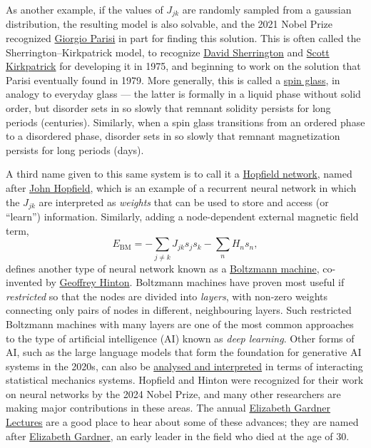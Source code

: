 As another example, if the values of $J_{jk}$ are randomly sampled from a gaussian distribution, the resulting model is also solvable, and the 2021 Nobel Prize recognized \href{https://en.wikipedia.org/wiki/Giorgio_Parisi}{Giorgio Parisi} in part for finding this solution.
This is often called the Sherrington--Kirkpatrick model, to recognize \href{https://en.wikipedia.org/wiki/David_Sherrington_(physicist)}{David Sherrington} and \href{https://en.wikipedia.org/wiki/Scott_Kirkpatrick}{Scott Kirkpatrick} for developing it in 1975, and beginning to work on the solution that Parisi eventually found in 1979.
More generally, this is called a \href{https://en.wikipedia.org/wiki/Spin_glass}{spin glass}, in analogy to everyday glass --- the latter is formally in a liquid phase without solid order, but disorder sets in so slowly that remnant solidity persists for long periods (centuries).
Similarly, when a spin glass transitions from an ordered phase to a disordered phase, disorder sets in so slowly that remnant magnetization persists for long periods (days).

A third name given to this same system is to call it a \href{https://en.wikipedia.org/wiki/Hopfield_network}{Hopfield network}, named after \href{https://en.wikipedia.org/wiki/John_Hopfield}{John Hopfield}, which is an example of a recurrent neural network in which the $J_{jk}$ are interpreted as \textit{weights} that can be used to store and access (or ``learn'') information.
Similarly, adding a node-dependent external magnetic field term,
\begin{equation*}
  E_{\text{BM}} = -\sum_{j \neq k} J_{jk} s_j s_k - \sum_n H_n s_n,
\end{equation*}
defines another type of neural network known as a \href{https://en.wikipedia.org/wiki/Boltzmann_machine}{Boltzmann machine}, co-invented by \href{https://en.wikipedia.org/wiki/Geoffrey_Hinton}{Geoffrey Hinton}.
Boltzmann machines have proven most useful if \textit{restricted} so that the nodes are divided into \textit{layers}, with non-zero weights connecting only pairs of nodes in different, neighbouring layers.
Such restricted Boltzmann machines with many layers are one of the most common approaches to the type of artificial intelligence (AI) known as \textit{deep learning}.
Other forms of AI, such as the large language models that form the foundation for generative AI systems in the 2020s, can also be \href{https://arxiv.org/abs/2312.10794}{analysed and interpreted} in terms of interacting statistical mechanics systems.
Hopfield and Hinton were recognized for their work on neural networks by the 2024 Nobel Prize, and many other researchers are making major contributions in these areas.
The annual \href{https://higgs.ph.ed.ac.uk/events/elizabeth-gardner-lectures/}{Elizabeth Gardner Lectures} are a good place to hear about some of these advances; they are named after \href{https://en.wikipedia.org/wiki/Elizabeth_Gardner_(physicist)}{Elizabeth Gardner}, an early leader in the field who died at the age of 30.

